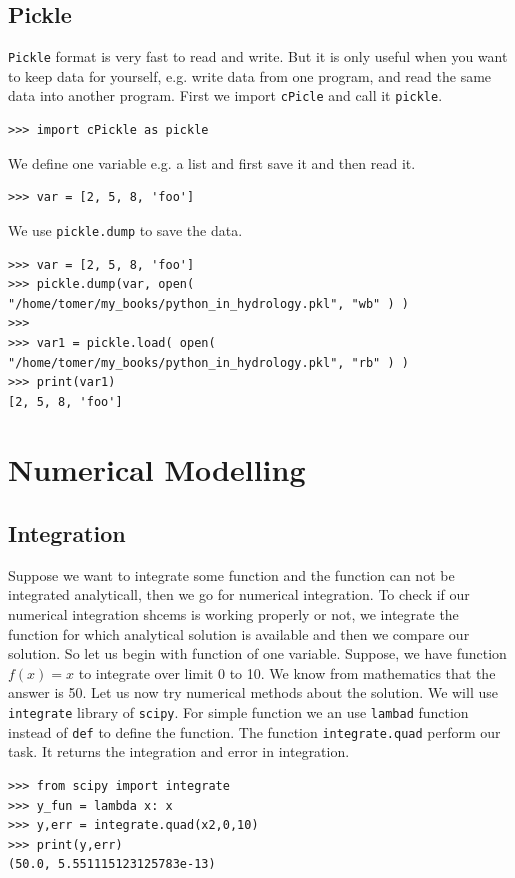 \documentclass[10pt]{book}
\begin{document}
{\section{Pickle}
\verb"Pickle" format is very fast to read and write. But it is only useful when you want to keep data for yourself, e.g. write data from one program, and read the same data into another program. First we import \verb"cPicle" and call it \verb"pickle". 
\beforeverb \begin{verbatim}
>>> import cPickle as pickle
\end{verbatim} \afterverb

We define one variable e.g. a list and first save it and then read it.
\beforeverb \begin{verbatim}
>>> var = [2, 5, 8, 'foo']
\end{verbatim} \afterverb

We use \verb"pickle.dump" to save the data. 
\beforeverb \begin{verbatim}
>>> var = [2, 5, 8, 'foo']
>>> pickle.dump(var, open( "/home/tomer/my_books/python_in_hydrology.pkl", "wb" ) )
>>> 
>>> var1 = pickle.load( open( "/home/tomer/my_books/python_in_hydrology.pkl", "rb" ) )
>>> print(var1)
[2, 5, 8, 'foo']
\end{verbatim} \afterverb

\chapter{Numerical Modelling}

\section{Integration}
Suppose we want to integrate some function and the function can not be integrated analyticall, then we go for numerical integration. To check if our numerical integration shcems is working properly or not, we integrate the function for which analytical solution is available and then we compare our solution. So let us begin with function of one variable. Suppose, we have function $f(x) = x$ to integrate over limit 0 to 10. We know from mathematics that the answer is 50. Let us now try numerical methods about the solution. We will use \verb"integrate" library of \verb"scipy". For simple function we an use \verb"lambad" function instead of \verb"def" to define the function. The function \verb"integrate.quad" perform our task. It returns the integration and error in integration.
\beforeverb \begin{verbatim}
>>> from scipy import integrate
>>> y_fun = lambda x: x
>>> y,err = integrate.quad(x2,0,10)
>>> print(y,err)
(50.0, 5.551115123125783e-13)
\end{verbatim} \afterverb

}
\end{document}
